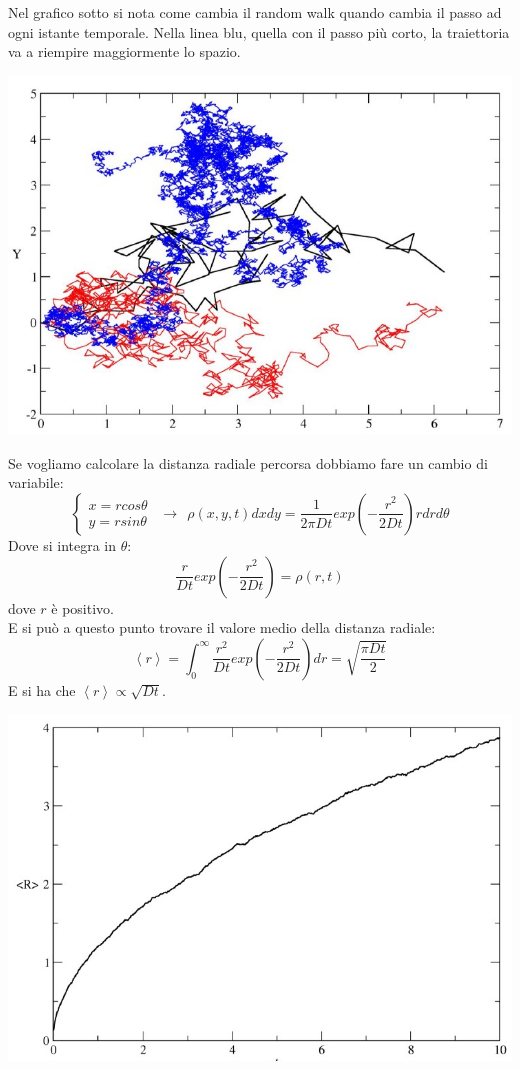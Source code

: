 \documentclass[12pt]{article}
\newcommand{\lang}{\left\langle}
\newcommand{\rang}{\right\rangle}
\begin{document}
Nel grafico sotto si nota come cambia il random walk quando cambia il passo ad ogni istante temporale. Nella linea blu, quella con il passo più corto, la traiettoria va a riempire maggiormente lo spazio.
\begin{center}
	\includegraphics[scale=.7]{Random walk 2D}
\end{center}
Se vogliamo calcolare la distanza radiale percorsa dobbiamo fare un cambio di variabile: 
$$
\begin{cases}
	x = r cos \theta \\
	y = r sin \theta
\end{cases} \ \ \longrightarrow \ \ \rho(x,y,t)dxdy = \frac{1}{2 \pi D t} exp(-\frac{r^2}{2Dt}) r dr d\theta
$$
Dove si integra in $\theta$: 
$$
	\frac{r}{Dt} exp(-\frac{r^2}{2Dt}) = \rho(r,t)
$$
dove $r$ è positivo. \\
E si può a questo punto trovare il valore medio della distanza radiale: 
\begin{equation}
	\lang r \rang = \int_0^\infty \frac{r^2}{Dt} exp \left(-\frac{r^2}{2Dt} \right)dr = \sqrt{\frac{\pi Dt}{2}}
\end{equation}
E si ha che $\lang r \rang \propto \sqrt{Dt}$.
\begin{center}
	\includegraphics[scale=.7]{Distanza radiale media RW}
\end{center} 
\end{document}
